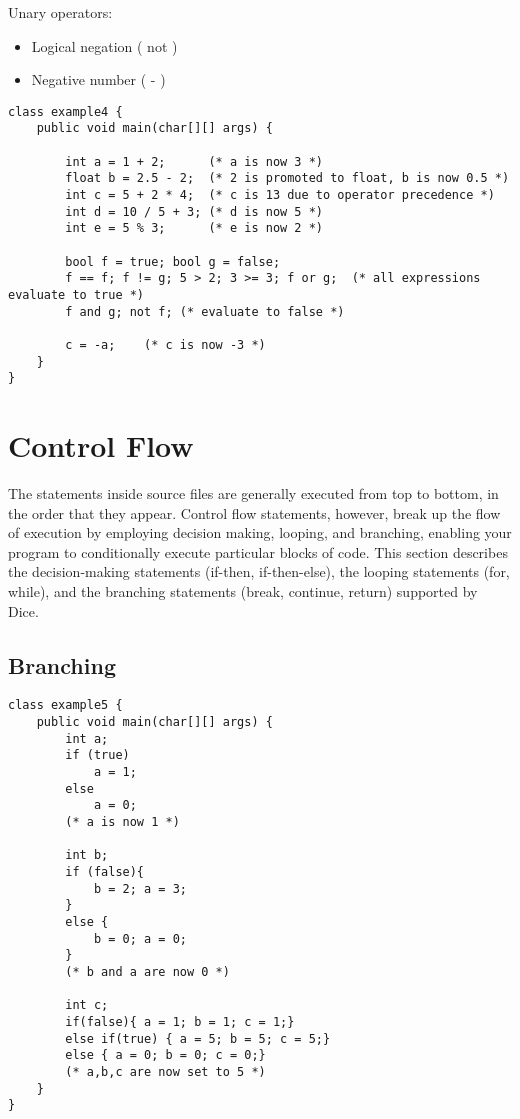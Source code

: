 \begin{homeworkProblem}
	Unary operators:
	\begin{itemize}
		\item Logical negation ( not )
		\item Negative number ( - )
	\end{itemize}

	\begin{verbatim}
class example4 {
	public void main(char[][] args) {

		int a = 1 + 2;      (* a is now 3 *)
		float b = 2.5 - 2;  (* 2 is promoted to float, b is now 0.5 *)
		int c = 5 + 2 * 4;  (* c is 13 due to operator precedence *)
		int d = 10 / 5 + 3; (* d is now 5 *)
		int e = 5 % 3; 	    (* e is now 2 *)

		bool f = true; bool g = false; 
		f == f; f != g; 5 > 2; 3 >= 3; f or g;  (* all expressions evaluate to true *)
		f and g; not f; (* evaluate to false *)

		c = -a;    (* c is now -3 *)
	}
}
	\end{verbatim}

	\section{Control Flow}
	The statements inside source files are generally executed from top to bottom, in the order that they appear. Control flow statements, however, break up the flow of execution by employing decision making, looping, and branching, enabling your program to conditionally execute particular blocks of code. This section describes the decision-making statements (if-then, if-then-else), the looping statements (for, while), and the branching statements (break, continue, return) supported by Dice.
	\subsection{Branching}
	\begin{verbatim}
class example5 {
	public void main(char[][] args) {
		int a;
		if (true)
			a = 1;
		else
			a = 0;
		(* a is now 1 *)

		int b;
		if (false){ 
			b = 2; a = 3; 
		}
		else {
			b = 0; a = 0; 
		}
		(* b and a are now 0 *)

		int c;
		if(false){ a = 1; b = 1; c = 1;}
		else if(true) { a = 5; b = 5; c = 5;}
		else { a = 0; b = 0; c = 0;}
		(* a,b,c are now set to 5 *)
	}
}
	\end{verbatim}

\end{homeworkProblem}
